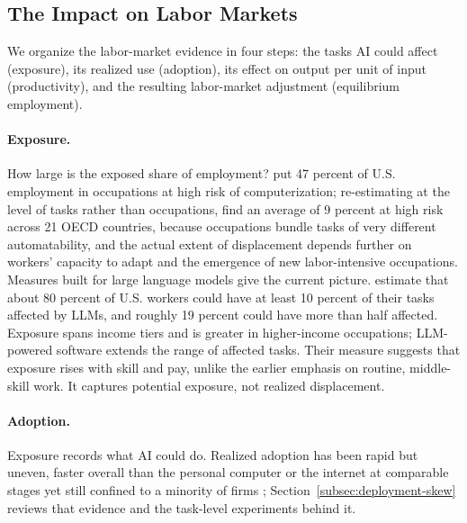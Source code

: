 \documentclass[12pt]{article}
\theoremstyle{plain}
\theoremstyle{definition}
\theoremstyle{remark}
\begin{document}
\subsection{The Impact on Labor Markets}\label{subsec:labor}

We organize the labor-market evidence in four steps: the tasks AI could affect
(exposure), its realized use (adoption), its effect on output per unit of
input (productivity), and the resulting labor-market adjustment
(equilibrium employment).

\paragraph{Exposure.} How large is the exposed share of employment?
\citet{FreyOsborne2017} put 47 percent of U.S. employment in occupations
at high risk of computerization; re-estimating at the level of tasks
rather than occupations, \citet{Arntz2016} find an average of 9 percent
at high risk across 21 OECD countries, because occupations bundle tasks of very different
automatability, and the actual extent of displacement depends further on
workers' capacity to adapt and the emergence of new labor-intensive
occupations. Measures built for large language models give the
current picture.
\citet{EloundouEtAl2024} estimate that about 80 percent of U.S.
workers could have at least 10 percent of their tasks affected by LLMs,
and roughly 19 percent could have more than half affected. Exposure
spans income tiers and is greater in higher-income occupations;
LLM-powered software extends the range of affected tasks. Their measure suggests that exposure rises with
skill and pay, unlike the earlier emphasis on routine, middle-skill
work. It captures potential exposure, not realized displacement.

\paragraph{Adoption.} Exposure records what AI could do. Realized
adoption has been rapid but uneven, faster overall than the personal
computer or the internet at comparable stages
\citep{BickBlandinDeming2025} yet
still confined to a minority of firms \citep{BonneyEtAl2024};
Section~\ref{subsec:deployment-skew} reviews that evidence and the
task-level experiments behind it.
\end{document}

